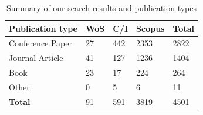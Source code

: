 \begin{table}[tb]
  \caption[Summary of search results in API documentation knowledge]{Summary of our search results and publication types}
  \label{esem2019:tab:search-results}
  \centering
  \begin{tabular}{l|lll|l}
    \toprule
    \textbf{Publication type} &
    \textbf{WoS} &
    \textbf{C/I} &
    \textbf{Scopus} &
    \textbf{Total} \\
    \midrule
    Conference Paper & 27 & 442 & 2353 & 2822 \\
    Journal Article & 41 & 127 & 1236 & 1404\\
    Book & 23 & 17 & 224 & 264\\
    Other & 0 & 5 & 6 & 11\\
    \midrule
    \textbf{Total} & 91 & 591 & 3819 & 4501\\
    \bottomrule
  \end{tabular}
\end{table}




